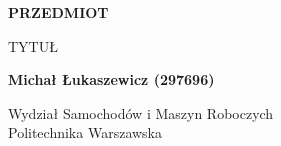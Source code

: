 \begin{titlepage}
    \begin{center}
        
        \vspace*{0.3\textheight}

        \textbf{PRZEDMIOT}

        \vspace{0.5cm}
        TYTUŁ

        \vspace{1.5cm}
        \textbf{Michał Łukaszewicz (297696)}

        \vfill

        Wydział Samochodów i Maszyn Roboczych\\
        Politechnika Warszawska
        
        
    \end{center}
\end{titlepage}